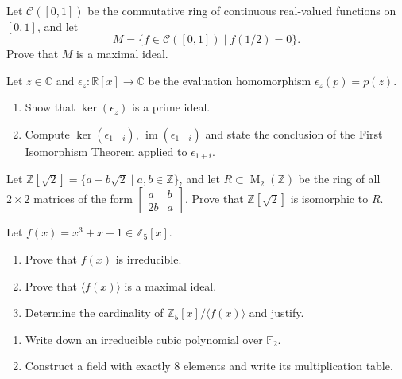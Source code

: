 \documentclass[11pt,twoside,openany]{memoir}
\begin{document}
    \begin{exercise}
    Let $\mathcal{C}([0,1])$ be the commutative ring of continuous real-valued functions on $[0,1]$, and let
    \[
        M=\{f\in \mathcal{C}([0,1]) \mid f(1/2)=0\}.
    \]
    Prove that $M$ is a maximal ideal.
    \end{exercise}
    
    \begin{exercise}
    Let $z\in \mathbb{C}$ and $\epsilon_z:\mathbb{R}[x]\to \mathbb{C}$ be the evaluation homomorphism $\epsilon_z(p)=p(z)$.
    \begin{enumerate}[label=(\alph*)]
        \item Show that $\ker(\epsilon_z)$ is a prime ideal.
        \item Compute $\ker(\epsilon_{1+i})$, $\operatorname{im}(\epsilon_{1+i})$ and state the conclusion of the First Isomorphism Theorem applied to $\epsilon_{1+i}$.
    \end{enumerate}
    \end{exercise}
    
    \begin{exercise}
    Let $\mathbb{Z}[\sqrt{2}]=\{a+b\sqrt{2} \mid a,b\in \mathbb{Z}\}$, and let $R\subset \operatorname{M}_2(\mathbb{Z})$ be the ring of all $2\times 2$ matrices of the form $\begin{bmatrix} a & b \\ 2b & a\end{bmatrix}$. Prove that $\mathbb{Z}[\sqrt{2}]$ is isomorphic to $R$.
    \end{exercise}
    
    \newpage
    \begin{exercise}
    Let $f(x)=x^3+x+1\in \mathbb{Z}_5[x]$.
    \begin{enumerate}[label=(\alph*)]
        \item Prove that $f(x)$ is irreducible.
        \item Prove that $\langle f(x)\rangle$ is a maximal ideal.
        \item Determine the cardinality of $\mathbb{Z}_5[x]/\langle f(x)\rangle$ and justify.
    \end{enumerate}
    \end{exercise}
    
    \begin{exercise}
    \begin{enumerate}[label=(\alph*)]
        \item Write down an irreducible cubic polynomial over $\mathbb{F}_2$.
        \item Construct a field with exactly 8 elements and write its multiplication table.
    \end{enumerate}
    \end{exercise}
    
\end{document}
